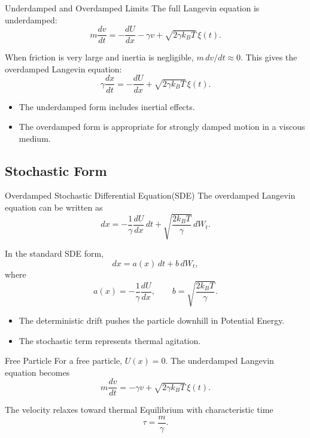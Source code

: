 \documentclass[a4paper, 10pt, onepage]{elegantbook}
\begin{document}
{\begin{frame}{Underdamped and Overdamped Limits}
  The full Langevin equation is underdamped:
  \[
    m\frac{dv}{dt}
    =
    -\frac{dU}{dx}
    -
    \gamma v
    +
    \sqrt{2\gamma k_BT}\,\xi(t).
  \]

  When friction is very large and inertia is negligible, \(m\,dv/dt\approx0\). This gives the overdamped Langevin 
equation:
  \[
    \gamma\frac{dx}{dt}
    =
    -\frac{dU}{dx}
    +
    \sqrt{2\gamma k_BT}\,\xi(t).
  \]

  \begin{itemize}
    \item The underdamped form includes inertial effects.
    \item The overdamped form is appropriate for strongly damped motion in a viscous medium.
  \end{itemize}
\end{frame}

\subsection{Stochastic Form}

\begin{frame}{Overdamped Stochastic Differential Equation(SDE)}
  The overdamped Langevin equation can be written as
  \[
    dx
    =
    -\frac{1}{\gamma}
    \frac{dU}{dx}\,dt
    +
    \sqrt{\frac{2k_BT}{\gamma}}\,dW_t.
  \]

  In the standard SDE form,
  \[
    dx=a(x)\,dt+b\,dW_t,
  \]
  where
  \[
    a(x)
    =
    -\frac{1}{\gamma}
    \frac{dU}{dx},
    \qquad
    b=\sqrt{\frac{2k_BT}{\gamma}}.
  \]

  \begin{itemize}
    \item The deterministic drift pushes the particle downhill in Potential Energy.
    \item The stochastic term represents thermal agitation.
  \end{itemize}
\end{frame}

\begin{frame}{Free Particle}
  For a free particle, \(U(x)=0\). The underdamped Langevin equation becomes
  \[
    m\frac{dv}{dt}
    =
    -\gamma v
    +
    \sqrt{2\gamma k_BT}\,\xi(t).
  \]

  The velocity relaxes toward thermal Equilibrium with characteristic time
  \[
    \tau=\frac{m}{\gamma}.
  \]


\end{frame}}
\end{document}
